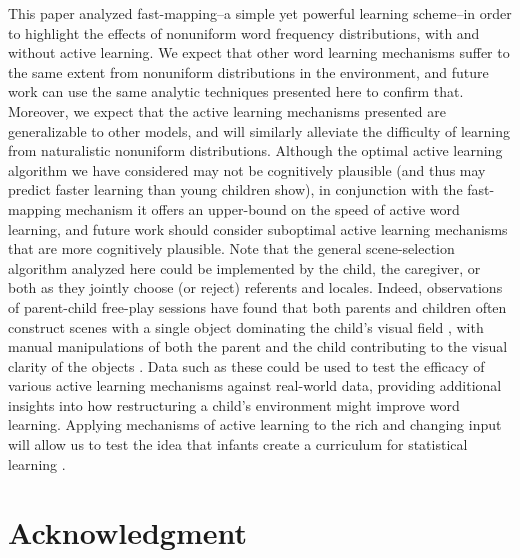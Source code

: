\documentclass[a4paper,natbib,man]{apa6}
\newcommand{\GK}[1]{#1}
\begin{document}
This paper analyzed fast-mapping--a simple yet powerful learning scheme--in order to highlight the effects of nonuniform word frequency distributions, with and without active learning. 
\GK{We expect that other word learning mechanisms suffer to the same extent from nonuniform distributions in the environment, and future work can use the same analytic techniques presented here to confirm that.
Moreover, we expect that the active learning mechanisms presented are generalizable to other models, and will similarly alleviate the difficulty of learning from naturalistic nonuniform distributions.
Although the optimal active learning algorithm we have considered may not be cognitively plausible (and thus may predict faster learning than young children show), in conjunction with the fast-mapping mechanism it offers an upper-bound on the speed of active word learning, and future work should consider suboptimal active learning mechanisms that are more cognitively plausible.}
Note that the general scene-selection algorithm analyzed here could be implemented by the child, the caregiver, or both as they jointly choose (or reject) referents and locales. 
\GK{Indeed, observations of parent-child free-play sessions have found that both parents and children often construct scenes with a single object dominating the child's visual field \citep{Yu:2009active}, with manual manipulations of both the parent and the child contributing to the visual clarity of the objects \citep{Suanda:2018}. 
Data such as these could be used to test the efficacy of various active learning mechanisms against real-world data, providing additional insights into how restructuring a child's environment might improve word learning.
Applying mechanisms of active learning to the rich and changing input will allow us to test the idea that infants create a curriculum for statistical learning \citep{Smith:2018}.
}



\section*{Acknowledgment}
\end{document}
